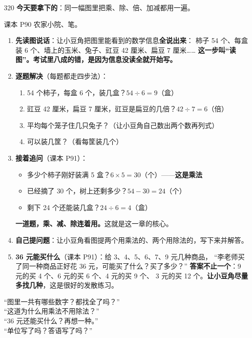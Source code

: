 \begin{lesson}{3}{20}
\textbf{今天要拿下的}：同一幅图里把乘、除、倍、加减都用一遍。

\begin{materials}
课本 P90 农家小院、笔。
\end{materials}

\begin{enumerate}
  \item \textbf{先读图说话}：让小豆角把图里能看到的数学信息\textbf{全说出来}：
        柿子 54 个、每盒装 6 个、墙上的玉米、兔子、豇豆 42 厘米、扁豆 7 厘米……
        \textbf{这一步叫“读图”。考试里八成的错，是因为信息没读全就开始写。}
  \item \textbf{逐题解决}（每题都走四步法）：
        \begin{enumerate}[label=（\arabic*）,itemsep=3pt]
          \item 54 个柿子，每盒 6 个，装几盒？$54\div6=9$（盒）
          \item 豇豆 42 厘米，扁豆 7 厘米，豇豆是扁豆的几倍？$42\div7=6$（倍）
          \item 平均每个笼子住几只兔子？（让小豆角自己数出两个数再列式）
          \item 可以装几筐？（看每筐装几个）
        \end{enumerate}
  \item \textbf{接着追问}（课本 P91）：
        \begin{itemize}
          \item 多少个柿子刚好装满 5 盒？$6\times5=30$（个）——\textbf{这是乘法}
          \item 已经摘了 30 个，树上还剩多少？$54-30=24$（个）
          \item 剩下 24 个还能装几盒？$24\div6=4$（盒）
        \end{itemize}
        \textbf{一道题，乘、减、除连着用。}这就是这一章的核心。
  \item \textbf{自己提问题}：让小豆角看图提两个用乘法的、两个用除法的，写下来并解答。
  \item \textbf{36 元能买什么}（课本 P91）：给 3、4、5、6、7、9 元几种商品，
        “李老师买了同一种商品正好花 36 元，可能买了什么？买了多少？”
        \textbf{答案不止一个}：9 元的买 4 个、6 元的买 6 个、4 元的买 9 个、
        3 元的买 12 个。\textbf{让小豆角尽量多找几种}，这是很好的发散练习。
\end{enumerate}

\begin{saybox}
“图里一共有哪些数字？都找全了吗？”\\
“这道为什么用乘法不用除法？”\\
“36 元还能买什么？再想一种。”\\
“单位写了吗？答语写了吗？”
\end{saybox}


\end{lesson}
